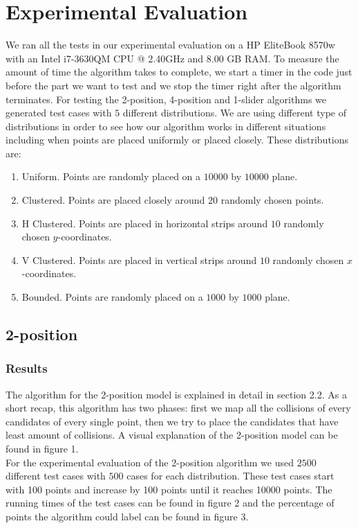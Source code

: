 \documentclass[crop=false,a4paper,oneside,11pt]{standalone}
\begin{document}
\section{Experimental Evaluation}

We ran all the tests in our experimental evaluation on a HP EliteBook 8570w with an Intel i7-3630QM CPU @ 2.40GHz and 8.00 GB RAM. To measure the amount of time the algorithm takes to complete, we start a timer in the code just before the part we want to test and we stop the timer right after the algorithm terminates. For testing the 2-position, 4-position and 1-slider algorithms we generated test cases with $5$ different distributions. We are using different type of distributions in order to see how our algorithm works in different situations including when points are placed uniformly or placed closely. These distributions are:
\begin{enumerate}
    \item Uniform. Points are randomly placed on a $10000$ by $10000$ plane.
    \item Clustered. Points are placed closely around $20$ randomly chosen points.
    \item H Clustered. Points are placed in horizontal strips around $10$ randomly chosen $y$-coordinates.
    \item V Clustered. Points are placed in vertical strips around $10$ randomly chosen $x$-coordinates.
    \item Bounded. Points are randomly placed on a $1000$ by $1000$ plane.
\end{enumerate}

\subsection{2-position}
\subsubsection{Results}
The algorithm for the 2-position model is explained in detail in section 2.2. As a short recap, this algorithm has two phases: first we map all the collisions of every candidates of every single point, then we try to place the candidates that have least amount of collisions. A visual explanation of the 2-position model can be found in figure 1.\\
For the experimental evaluation of the 2-position algorithm we used $2500$ different test cases with $500$ cases for each distribution. These test cases start with 100 points and increase by 100 points until it reaches 10000 points. The running times of the test cases can be found in figure 2 and the percentage of points the algorithm could label can be found in figure 3.\\
\end{document}
